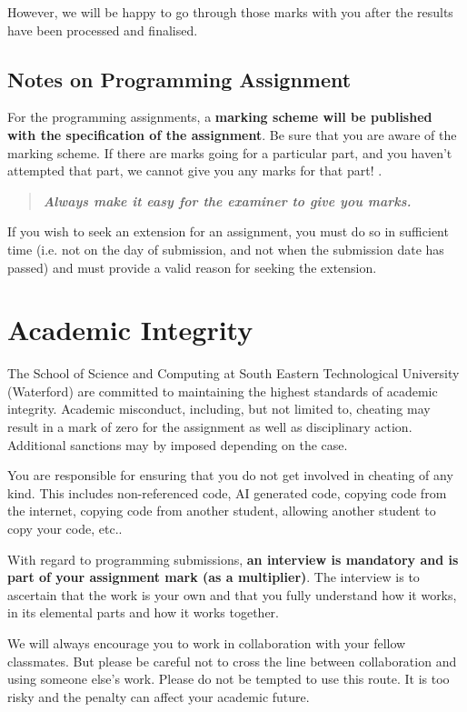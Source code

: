 \documentclass{article}
\begin{document}
However, we will be happy to go through those marks with you 
after the results have been processed and finalised. 

\subsection{Notes on Programming Assignment}

For the programming assignments, a \textbf{marking scheme will be published with the specification of the assignment}. Be sure that you are aware of the marking scheme. 
If there are marks going for a particular part, and you haven't attempted that part, we cannot give you any marks for that part! . 
\begin{quote}
 \textbf{\textit{Always make it easy for the examiner to give you marks.}}
\end{quote}

If you wish to seek an extension for an assignment, you must do so in sufficient time (i.e. not on the day of submission, and not 
when the submission date has passed) and must provide a valid reason for seeking the extension. 


\section{Academic Integrity}
The School of Science and Computing  at South Eastern Technological University (Waterford) are  committed to maintaining the highest standards of academic integrity. 
Academic misconduct, including, but not limited to, 
cheating may result in a mark of zero for the assignment as well as disciplinary action.
 Additional sanctions may by imposed depending on the case. 


 You are responsible for ensuring that you do not get involved in cheating of any kind. This includes non-referenced code, 
 AI generated code, copying code from the internet, copying code from another student,
    allowing another student to copy your code, etc..
 
 With regard to programming submissions, \textbf{an interview is mandatory and is part of your assignment mark (as a multiplier)}. 
 The interview is to ascertain that the work is your own and that you fully understand how it works, in its elemental parts and how it works together. 
 
We  will always encourage you to work in collaboration with your fellow classmates. But please be careful not to cross the line between collaboration and using someone else's work. 
 Please do not be tempted to use this route. 
 It is too risky and the penalty can affect your academic future. 
\pagebreak
\end{document}
